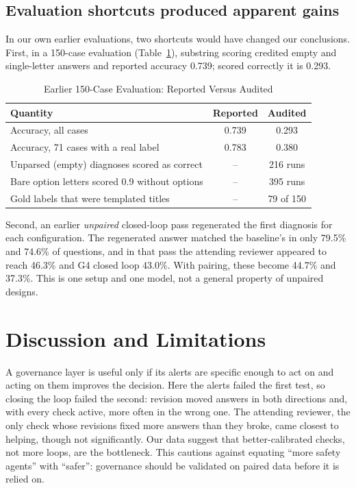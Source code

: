 \documentclass[conference]{IEEEtran}
\begin{document}
\subsection{Evaluation shortcuts produced apparent gains}
In our own earlier evaluations, two shortcuts would have changed our conclusions. First, in a 150-case evaluation (Table~\ref{tab:audit}),
substring scoring credited empty and single-letter answers and reported accuracy 0.739; scored correctly it is 0.293.

\begin{table}[t]
\centering
\caption{Earlier 150-Case Evaluation: Reported Versus Audited}
\label{tab:audit}
\footnotesize
\begin{tabular}{@{}lcc@{}}
\toprule
\textbf{Quantity} & \textbf{Reported} & \textbf{Audited} \\
\midrule
Accuracy, all cases & 0.739 & 0.293 \\
Accuracy, 71 cases with a real label & 0.783 & 0.380 \\
Unparsed (empty) diagnoses scored as correct & -- & 216 runs \\
Bare option letters scored 0.9 without options & -- & 395 runs \\
Gold labels that were templated titles & -- & 79 of 150 \\
\bottomrule
\end{tabular}
\end{table} Second, an earlier
\emph{unpaired} closed-loop pass regenerated the first diagnosis for each configuration. The regenerated answer matched
the baseline's in only 79.5\% and 74.6\% of questions, and in that pass the attending reviewer appeared to reach
46.3\% and G4 closed loop 43.0\%. With pairing, these become 44.7\% and 37.3\%. This is one setup and one model, not
a general property of unpaired designs.

\section{Discussion and Limitations}
A governance layer is useful only if its alerts are specific enough to act on and acting on them improves the
decision. Here the alerts failed the first test, so closing the loop failed the second: revision moved answers in both
directions and, with every check active, more often in the wrong one. The attending reviewer, the only check whose
revisions fixed more answers than they broke, came closest to helping, though not significantly. Our data suggest that
better-calibrated checks, not more loops, are the bottleneck. This cautions against equating ``more safety agents''
with ``safer'': governance should be validated on paired data before it is relied on.
\end{document}
